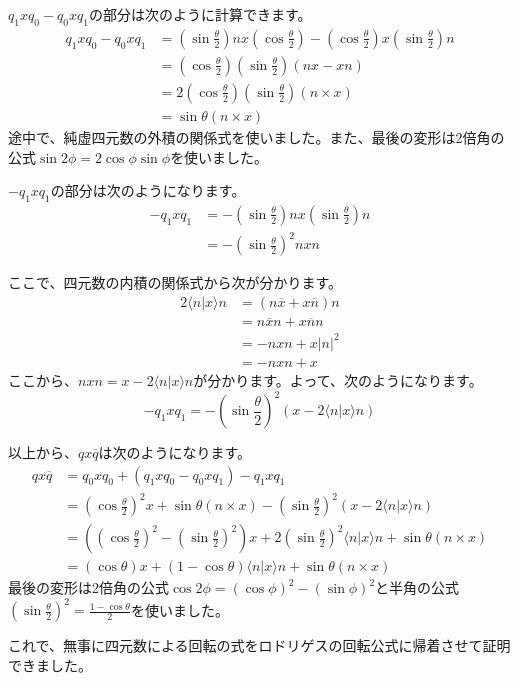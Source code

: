 \documentclass{jlreq}
\numberwithin{equation}{section}
\begin{document}
$q_1xq_0-q_0xq_1$の部分は次のように計算できます。
\begin{align}
    q_1xq_0-q_0xq_1 & =\left(\sin\frac{\theta}{2}\right)nx\left(\cos\frac{\theta}{2}\right)-\left(\cos\frac{\theta}{2}\right)x\left(\sin\frac{\theta}{2}\right)n \\
                    & =\left(\cos\frac{\theta}{2}\right)\left(\sin\frac{\theta}{2}\right)(nx-xn)                                                                 \\
                    & =2\left(\cos\frac{\theta}{2}\right)\left(\sin\frac{\theta}{2}\right)(n\times x)                                                            \\
                    & =\sin\theta(n\times x)
\end{align}
途中で、純虚四元数の外積の関係式を使いました。また、最後の変形は2倍角の公式$\sin 2\phi=2\cos\phi\sin\phi$を使いました。

$-q_1xq_1$の部分は次のようになります。
\begin{align}
    -q_1xq_1 & =-\left(\sin\frac{\theta}{2}\right)nx\left(\sin\frac{\theta}{2}\right)n \\
             & =-\left(\sin\frac{\theta}{2}\right)^2nxn
\end{align}

ここで、四元数の内積の関係式から次が分かります。
\begin{align}
    2\langle n|x\rangle n & = (n\overline{x}+x\overline{n})n \\
                          & =n\overline{x}n+x\overline{n}n   \\
                          & =-nxn+x|n|^2                     \\
                          & =-nxn+x
\end{align}
ここから、$nxn=x-2\langle n|x\rangle n$が分かります。よって、次のようになります。
\begin{equation}
    -q_1xq_1=-\left(\sin\frac{\theta}{2}\right)^2(x-2\langle n|x\rangle n)
\end{equation}

以上から、$qx\overline{q}$は次のようになります。
\begin{align}
    qx\overline{q} & =q_0xq_0+(q_1xq_0-q_0xq_1)-q_1xq_1                                                                                                                                    \\
                   & =\left(\cos\frac{\theta}{2}\right)^2x+\sin\theta(n\times x)-\left(\sin\frac{\theta}{2}\right)^2(x-2\langle n|x\rangle n)                                              \\
                   & =\left(\left(\cos\frac{\theta}{2}\right)^2-\left(\sin\frac{\theta}{2}\right)^2\right)x+2\left(\sin\frac{\theta}{2}\right)^2\langle n|x\rangle n+\sin\theta(n\times x) \\
                   & =(\cos\theta)x+(1-\cos\theta)\langle n|x\rangle n+\sin\theta(n\times x)
\end{align}
最後の変形は2倍角の公式$\cos 2\phi=(\cos\phi)^2-(\sin\phi)^2$と半角の公式$\left(\sin\frac{\theta}{2}\right)^2=\frac{1-\cos\theta}{2}$を使いました。

これで、無事に四元数による回転の式をロドリゲスの回転公式に帰着させて証明できました。
\end{document}

